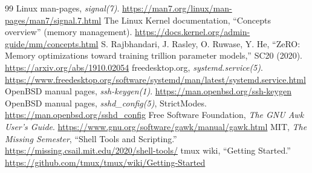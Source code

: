 \documentclass[11pt,a4paper]{article}
\begin{document}
\begin{thebibliography}{99}\small
{} Linux man-pages, \emph{signal(7)}. \url{https://man7.org/linux/man-pages/man7/signal.7.html}
 The Linux Kernel documentation, ``Concepts overview'' (memory management). \url{https://docs.kernel.org/admin-guide/mm/concepts.html}
 S. Rajbhandari, J. Rasley, O. Ruwase, Y. He, ``ZeRO: Memory optimizations toward training trillion parameter models,'' SC20 (2020). \url{https://arxiv.org/abs/1910.02054}
 freedesktop.org, \emph{systemd.service(5)}. \url{https://www.freedesktop.org/software/systemd/man/latest/systemd.service.html}
 OpenBSD manual pages, \emph{ssh-keygen(1)}. \url{https://man.openbsd.org/ssh-keygen}
 OpenBSD manual pages, \emph{sshd\_config(5)}, StrictModes. \url{https://man.openbsd.org/sshd_config}
 Free Software Foundation, \emph{The GNU Awk User's Guide}. \url{https://www.gnu.org/software/gawk/manual/gawk.html}
 MIT, \emph{The Missing Semester}, ``Shell Tools and Scripting.'' \url{https://missing.csail.mit.edu/2020/shell-tools/}
 tmux wiki, ``Getting Started.'' \url{https://github.com/tmux/tmux/wiki/Getting-Started}
\end{thebibliography}
\end{document}
